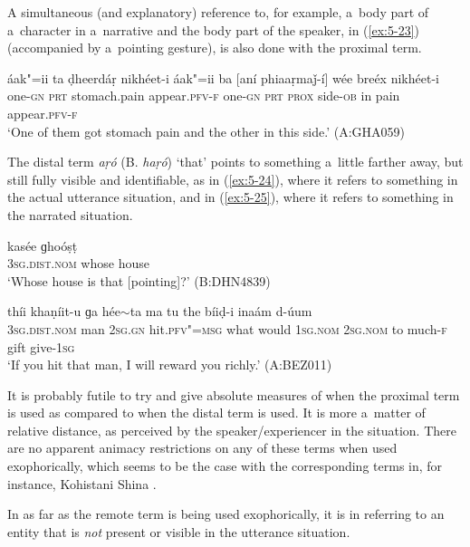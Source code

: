 A simultaneous (and explanatory) reference to, for example, a~body part of a~character in a~narrative and the body part of the speaker, in (\ref{ex:5-23}) (accompanied by a~pointing gesture), is also done with the proximal term.


\begin{exe}
\ex
\label{ex:5-23}
\gll áak"=ii ta ḍheerdáṛ nikhéet-i áak"=ii ba [aní phiaaṛmaǰ-í] wée
breéx nikhéet-i \\
one-\textsc{gn} \textsc{prt} stomach.pain appear.\textsc{pfv-f} one-\textsc{gn} \textsc{prt}
\textsc{prox} side-\textsc{ob} in pain appear.\textsc{pfv-f} \\
\glt `One of them got stomach pain and the other in this side.' (A:GHA059)
\end{exe}
The distal term \textit{aṛó} (B. \textit{haṛó}) `that' points to something a~little farther away, but still fully visible and identifiable, as in (\ref{ex:5-24}), where it refers to something in the actual utterance situation, and in (\ref{ex:5-25}), where it refers to something in the narrated situation. 

\begin{exe}
\ex
\label{ex:5-24}
\gll [haṛó] kasée ɡhoóṣṭ \\
\textsc{3sg}.\textsc{dist.nom} whose house \\
\glt `Whose house is that [pointing]?' (B:DHN4839)

\ex
\label{ex:5-25}
 thíi khaṇíit-u ɡa hée$\sim$ta ma tu the bíiḍ-i inaám d-úum \\
\textsc{3sg.dist.nom} man \textsc{2sg.gn} hit.\textsc{pfv"=msg} what would \textsc{1}\textsc{sg.nom} 
\textsc{2sg.nom} to much-\textsc{f} gift give-\textsc{1}\textsc{sg} \\
\glt `If you hit that man, I will reward you richly.' (A:BEZ011)
\end{exe}
It is probably futile to try and give absolute measures of when the proximal term is used as compared to when the distal term is used. It is more a~matter of relative distance, as perceived by the speaker/experiencer in the situation. There are no apparent animacy restrictions on any of these terms when used exophorically, which seems to be the case with the corresponding terms in, for instance, Kohistani Shina \citep[135]{schmidtkohistani2001}.

In as far as the remote term is being used exophorically, it is in referring to an entity that is \textit{not} present or visible in the utterance situation. 


